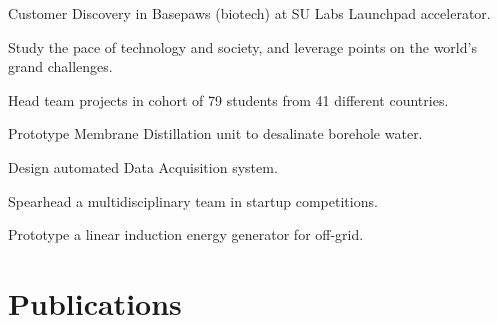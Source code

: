 \documentclass[letterpaper]{deedy-resume} %
\begin{document}
\begin{minipage}[t]{0.66\textwidth}

\begin{tightitemize}
    \item Customer Discovery in Basepaws (biotech) at SU Labs Launchpad accelerator.
    \item Study the pace of technology and society, and leverage points on the world’s grand challenges.
    \item Head team projects in cohort of 79 students from 41 different countries.
    
\end{tightitemize}

\sectionspace %



\begin{tightitemize}
    \item Prototype Membrane Distillation unit to desalinate borehole water.
    \item Design automated Data Acquisition system.
\end{tightitemize}

\sectionspace %



\begin{tightitemize}
    \item Spearhead a multidisciplinary team in startup competitions.
    \item Prototype a linear induction energy generator for off-grid.
\end{tightitemize}

\sectionspace %



\section{Publications}


\end{minipage}
\end{document}
